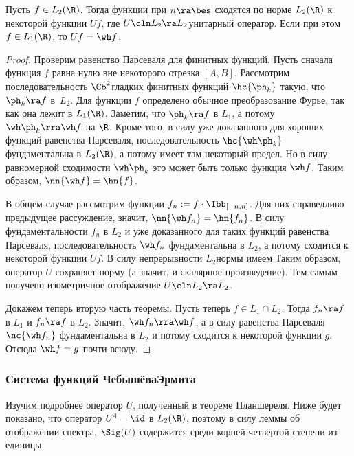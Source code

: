 \documentclass[a4paper]{article}
\def\fsp{\frac{1}{\sqrt{2\pi}}}
\newcommand{\dx}{\,dx}
\begin{document}
\begin{theorem}[Планшереля]
Пусть $f\in L_2(\R)$. Тогда функции
\eqn{\fsp \intl{-n}{n}f(x)e^{-i\la x}\dx}
при $n\ra\bes$ сходятся по норме $L_2(\R)$ к некоторой функции $U f$, где $U\cln L_2\ra L_2$\т унитарный оператор.
Если при этом $f\in L_1(\R)$, то $Uf = \wh f$.
\end{theorem}
\begin{proof}
Проверим равенство Парсеваля для финитных функций. Пусть сначала функция $f$ равна нулю вне некоторого отрезка $[A,B]$. Рассмотрим последовательность $\Cb^2$\д гладких
финитных функций $\hc{\ph_k}$ такую, что $\ph_k \ra f$ в~$L_2$. Для функции $f$ определено обычное
преобразование Фурье, так как она лежит в $L_1(\R)$. Заметим, что $\ph_k \ra f$ в $L_1$, а потому $\wh \ph_k \rra \wh f$
на $\R$. Кроме того, в силу уже доказанного для хороших функций равенства Парсеваля, последовательность $\hc{\wh \ph_k}$
фундаментальна в $L_2(\R)$, а потому имеет там некоторый предел. Но в силу  равномерной сходимости $\wh \ph_k$ это
может быть только функция $\wh f$. Таким образом, $\nn{\wh f} = \hn{f}$.

В общем случае рассмотрим функции $f_n := f \cdot \Ibb_{[-n,n]}$. Для них справедливо предыдущее рассуждение, значит,
$\nn{\wh f_n} = \hn{f_n}$. В силу фундаментальности $f_n$ в $L_2$ и уже доказанного для таких функций равенства
Парсеваля, последовательность $\wh f_n$ фундаментальна в $L_2$, а потому сходится к некоторой функции $U f$.
В силу непрерывности $L_2$\д нормы имеем
Таким образом, оператор $U$ сохраняет норму (а значит, и скалярное произведение).
Тем самым получено изометричное отображение $U\cln L_2\ra L_2$.

Докажем теперь вторую часть теоремы. Пусть теперь $f \in L_1 \cap L_2$. Тогда
$f_n \ra f$ в $L_1$ и $f_n\ra f$ в $L_2$. Значит, $\wh f_n \rra \wh f$, а
в силу равенства Парсеваля $\nc{\wh f_n}$ фундаментальна в $L_2$ и потому сходится к некоторой функции $g$.
Отсюда $\wh f = g$ почти всюду.
\end{proof}

\subsubsection{Система функций Чебышёва\ч Эрмита}

Изучим подробнее оператор $U$, полученный в теореме Планшереля.
Ниже будет показано, что оператор $U^4 = \id$ в $L_2(\R)$, поэтому
в силу леммы об отображении спектра, $\Sig(U)$ содержится среди корней четвёртой степени из единицы.
\end{document}
